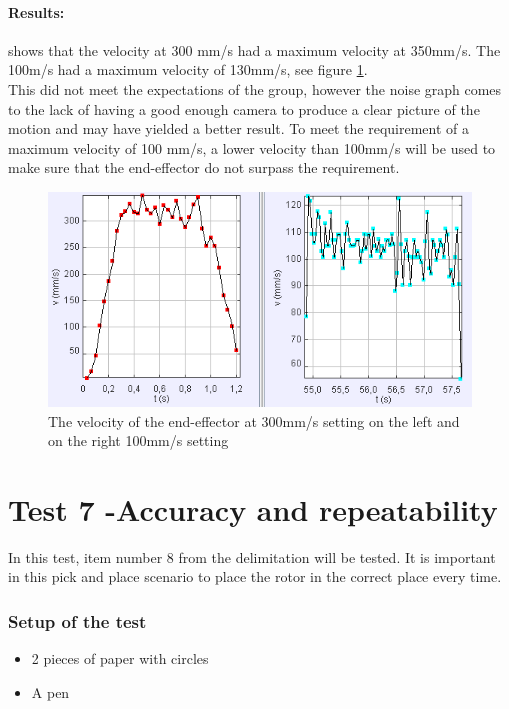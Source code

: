 \paragraph{Results: }
shows that the velocity at 300 mm/s had a maximum velocity at 350mm/s. The 100m/s had a maximum velocity of 130mm/s, see figure \ref{fig:velocitytest}.\\
This did not meet the expectations of the group, however the noise graph comes to the lack of having a good enough camera to produce a clear picture of the motion and may have yielded a better result. To meet the requirement of a maximum velocity of 100 mm/s, a lower velocity than 100mm/s will be used to make sure that the end-effector do not surpass the requirement.\\ 

\begin{figure}[H]
  \centering
    \includegraphics[width=\textwidth]{Design/velcit.PNG}
    \caption{The velocity of the end-effector at 300mm/s setting on the left and on the right 100mm/s setting}  \label{fig:velocitytest}
\end{figure}

\section{Test 7 -Accuracy and repeatability}
In this test, item number 8 from the delimitation will be tested. It is important in this pick and place scenario to place the rotor in the correct place every time. 

\subsubsection{Setup of the test}

\begin{itemize}
 \item 2 pieces of paper with circles 
 \item A pen 
\end{itemize}

